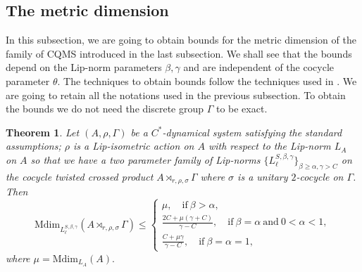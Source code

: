 \documentclass[a4paper,11pt,reqno]{amsart}
\theoremstyle{plain}
\newtheorem{thm}{Theorem}[section]
\theoremstyle{mainthmstyle}
\theoremstyle{named}
\numberwithin{equation}{section}
\begin{document}
\subsection{The metric dimension} In this subsection, we are going to obtain bounds for the metric dimension of the family of CQMS introduced in the last subsection. We shall see that the bounds depend on the Lip-norm parameters $\beta,\gamma$ and are independent of the cocycle parameter $\theta$. The techniques to obtain bounds follow the techniques used in \cites{Soumalya-Arnab1,Soumalya-Arnab2}. We are going to retain all the notations used in the previous subsection. To obtain the bounds we do not need the discrete group $\Gamma$ to be exact.
\begin{thm}\label{Mdimupper}
Let $(A,\rho,\Gamma)$ be a $C^{\ast}$-dynamical system satisfying the standard assumptions; $\rho$ is a Lip-isometric action on $A$ with respect to the Lip-norm $L_A$ on $A$ so that we have a two parameter family of Lip-norms $\{L^{S,\beta,\gamma}_{\ell}\}_{\beta\geq \alpha,\gamma>C}$ on the cocycle twisted crossed product $A\rtimes_{r,\rho,\sigma}\Gamma$ where $\sigma$ is a unitary $2$-cocycle on $\Gamma$. Then 
\begin{displaymath}\mathrm {Mdim}_{L_{\ell}^{S, \beta, \gamma}} \left (A \rtimes_{r, \rho, \sigma} \Gamma \right ) \leq \begin{cases} \mu, \quad \mathrm{if}\ \beta > \alpha, \\ \frac {2 C + \mu (\gamma + C)} {\gamma - C}, \quad \mathrm{if}\ \beta = \alpha\ \mathrm{and}\ 0 < \alpha < 1, \\ \frac {C + \mu \gamma} {\gamma - C}, \quad \mathrm{if}\ \beta = \alpha = 1, \end{cases}\end{displaymath}
where $\mu = \mathrm{Mdim}_{L_A} (A).$

\end{thm}
\end{document}

